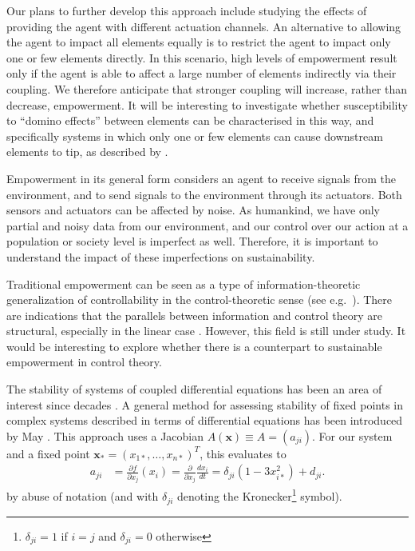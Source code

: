 \documentclass[conference]{IEEEtran}
\newcommand{\vectorsym}[1]{\ensuremath{\mathbf{#1}}}
\begin{document}
Our plans to further develop this approach include studying the
effects of providing the agent with different actuation channels. An
alternative to allowing the agent to impact all elements equally is to
restrict the agent to impact only one or few elements directly. In
this scenario, high levels of empowerment result only if the agent is
able to affect a large number of elements indirectly via their
coupling. We therefore anticipate that stronger coupling will
increase, rather than decrease, empowerment. It will be interesting to
investigate whether susceptibility to ``domino effects'' between
elements can be characterised in this way, and specifically systems in
which only one or few elements can cause  downstream elements to tip, as
described by \cite{Brummitt2015_coupledcatastrophes}.

Empowerment in its general form considers an agent to receive signals
from the environment, and to send signals to the environment through
its actuators. Both sensors and actuators can be affected by noise. As
humankind, we have only partial and noisy data from our environment,
and our control over our action at a population or society level is
imperfect as well. Therefore, it is important to understand the impact
of these imperfections on sustainability.

Traditional empowerment can be seen as a type of information-theoretic
generalization of controllability in the control-theoretic sense (see
e.g.\ \cite{Tiomkin2017_controlcapacity}). There are indications that
the parallels between information and control theory are structural,
especially in the linear case \cite{Tanaka2018_mindirinfolqgcontrol}.
However, this field is still under study. It would be interesting to
explore whether there is a counterpart to sustainable empowerment in
control theory.

The stability of systems of coupled differential equations has been an
area of interest since decades \cite{Landi2018_ecologicalnetworks}. A
general method for assessing stability of fixed points in complex
systems described in terms of differential equations has been
introduced by May \cite{May1972_stablelargecomplexsystem}. This
approach uses a Jacobian $A(\vectorsym{x}) \equiv A = (a_{ji})$. For
our system and a fixed point
$\vectorsym{x}_* = (x_{1*}, \ldots, x_{n*})^T$, this evaluates to
\begin{align*}
  a_{ji} &= \frac{\partial f}{\partial x_j}(x_i) = \frac{\partial}{\partial x_j}\frac{d x_i}{d t} = \delta_{ji} (1 - 3 x_{i*}^2) + d_{ji}.
\end{align*}
by abuse of notation (and with $\delta_{ji}$ denoting the
Kronecker\footnote{$\delta_{ji}=1$ if $i=j$ and $\delta_{ji}=0$
  otherwise} symbol).
\end{document}
